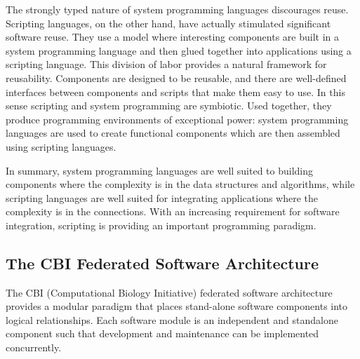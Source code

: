 \documentclass[12pt]{article}
\begin{document}
The strongly typed nature of system programming languages discourages
reuse. Scripting languages, on the other hand, have actually
stimulated significant software reuse. They use a model where
interesting components are built in a system programming language and
then glued together into applications using a scripting language.
This division of labor provides a natural framework for reusability.
Components are designed to be reusable, and there are well-defined
interfaces between components and scripts that make them easy to use.
In this sense scripting and system programming are symbiotic. Used
together, they produce programming environments of exceptional power:
system programming languages are used to create functional components
which are then assembled using scripting languages.

In summary, system programming languages are well suited to building
components where the complexity is in the data structures and
algorithms, while scripting languages are well suited for integrating
applications where the complexity is in the connections.  With an
increasing requirement for software integration, scripting is
providing an important programming paradigm.





\subsection{The CBI Federated Software Architecture}

The CBI (Computational Biology Initiative) federated software
architecture provides a modular paradigm that places stand-alone
software components into logical relationships.  Each software module
is an independent and standalone component such that development and
maintenance can be implemented concurrently.
\end{document}
